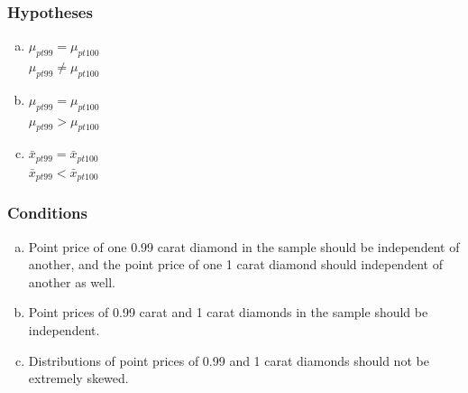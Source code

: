 \documentclass[notes,11pt, aspectratio=169]{beamer}
\begin{document}

\begin{frame}
\frametitle{Hypotheses}


\begin{enumerate}[(a)]

\item  {} $\mu_{pt99} = \mu_{pt100}$ \\
 $\mu_{pt99} \ne \mu_{pt100}$

\item  {} $\mu_{pt99} = \mu_{pt100}$ \\
 $\mu_{pt99} > \mu_{pt100}$


\item  {} $\bar{x}_{pt99} = \bar{x}_{pt100}$ \\
 $\bar{x}_{pt99} < \bar{x}_{pt100}$

\end{enumerate}

\end{frame}


\begin{frame}
\frametitle{Conditions}


\begin{enumerate}[(a)]

\item Point price of one 0.99 carat diamond in the sample should be independent of another, and the point price of one 1 carat diamond should independent of another as well.

\item Point prices of 0.99 carat and 1 carat diamonds in the sample should be independent.

\item Distributions of point prices of 0.99 and 1 carat diamonds should not be extremely skewed.


\end{enumerate}

\end{frame}
\end{document}
